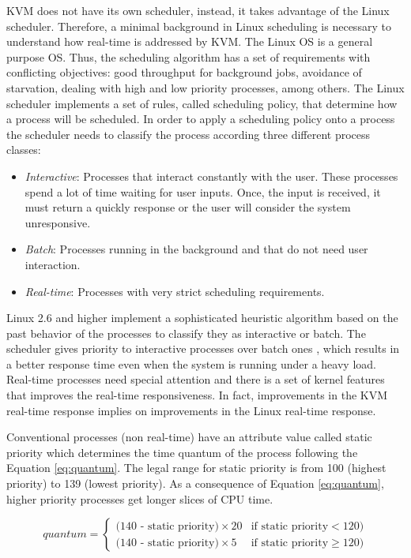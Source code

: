 KVM does not have its own scheduler, instead, it takes advantage of the Linux scheduler. Therefore, a minimal background in Linux scheduling is necessary  to understand how real-time is addressed by KVM. The Linux OS is a general purpose OS. Thus, the scheduling algorithm has a set of requirements with conflicting objectives: good throughput for background jobs, avoidance of starvation, dealing with high and low priority processes, among others. The Linux scheduler implements a set of rules, called scheduling policy, that determine how a process will be scheduled. In order to apply a scheduling policy onto a process the scheduler needs to classify the process according three different process classes:

\begin{itemize}
\item \emph{Interactive}: Processes that interact constantly with the user. These processes spend a lot of time waiting for user inputs. Once, the input is received, it must return a quickly response or the user will consider the system unresponsive.
\item \emph{Batch}: Processes running in the background and that do not need user interaction. 
\item \emph{Real-time}: Processes with very strict scheduling requirements. 
\end{itemize}

Linux 2.6 and higher implement a sophisticated heuristic algorithm based on the past behavior of the processes to classify they as interactive or batch. The scheduler gives priority to interactive processes over batch ones \cite{bovet}, which results in a better response time even when the system is running under a heavy load. Real-time processes need special attention and there is a set of kernel features that improves the real-time responsiveness. In fact, improvements in the KVM real-time response implies on improvements in the Linux real-time response. 

Conventional processes (non real-time) have an attribute value called static priority which determines the time quantum of the process following the Equation \ref{eq:quantum}. The legal range for static priority is from 100 (highest priority) to 139 (lowest priority). As a consequence of Equation \ref{eq:quantum}, higher priority processes get longer slices of CPU time.


\begin{equation}
\label{eq:quantum}
quantum = \left\{\begin{matrix}
(\text{140 - static priority)} \times \text{20} & \text{if static priority} < \text{120}) \\
(\text{140 - static priority)} \times \text{5} & \text{if static priority}  \geq \text{120})
\end{matrix}\right.
\end{equation}

